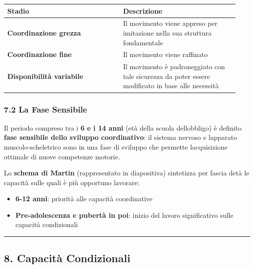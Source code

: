 \documentclass[a4paper,11pt]{article}
\providecommand{\tightlist}{%
  \setlength{\itemsep}{0pt}\setlength{\parskip}{0pt}}
\begin{document}
\begin{longtable}[]{@{}p{0.47\linewidth}p{0.47\linewidth}@{}}
      \toprule\noalign{}
      Stadio                           & Descrizione                           \\
      \midrule\noalign{}
      \endhead
      \bottomrule\noalign{}
      \endlastfoot
      \textbf{Coordinazione grezza}    & Il movimento viene appreso per
      imitazione nella sua struttura fondamentale                              \\
      \textbf{Coordinazione fine}      & Il movimento viene raffinato          \\
      \textbf{Disponibilità variabile} & Il movimento è padroneggiato con tale
      sicurezza da poter essere modificato in base alle necessità              \\
\end{longtable}

\subsubsection{7.2 La Fase Sensibile}\label{la-fase-sensibile}

Il periodo compreso tra i \textbf{6 e i 14 anni} (età della scuola
dell\textquotesingle obbligo) è definito \textbf{fase sensibile dello
      sviluppo coordinativo}: il sistema nervoso e l\textquotesingle apparato
muscolo-scheletrico sono in una fase di sviluppo che permette
l\textquotesingle acquisizione ottimale di nuove competenze motorie.

Lo \textbf{schema di Martin} (rappresentato in diapositiva) sintetizza
per fascia d\textquotesingle età le capacità sulle quali è più opportuno
lavorare:

\begin{itemize}
      \tightlist
      \item
            \textbf{6-12 anni}: priorità alle capacità coordinative
      \item
            \textbf{Pre-adolescenza e pubertà in poi}: inizio del lavoro
            significativo sulle capacità condizionali
\end{itemize}

\begin{center}\rule{0.5\linewidth}{0.5pt}\end{center}

\subsection{8. Capacità Condizionali}\label{capacituxe0-condizionali-1}
\end{document}
